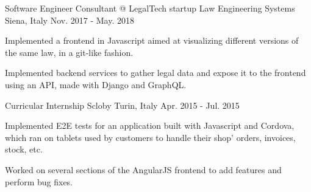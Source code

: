 \begin{cventries}
  \cventry
    {Software Engineer Consultant @ LegalTech startup} %
    {Law Engineering Systems} %
    {Siena, Italy} %
    {Nov. 2017 - May. 2018} %
    {
      \begin{cvitems} %
        \item {Implemented a frontend in Javascript aimed at visualizing different versions of the same law, in a git-like fashion.}
        \item {Implemented backend services to gather legal data and expose it to the frontend using an API, made with Django and GraphQL.}
      \end{cvitems}
    }

  \cventry
    {Curricular Internship} %
    {Scloby} %
    {Turin, Italy} %
    {Apr. 2015 - Jul. 2015} %
    {
      \begin{cvitems} %
        \item {Implemented E2E tests for an application built with Javascript and Cordova, which ran on tablets used by customers to handle their shop' orders, invoices, stock, etc.}
        \item {Worked on several sections of the AngularJS frontend to add features and perform bug fixes.}
      \end{cvitems}
    }

\end{cventries}
